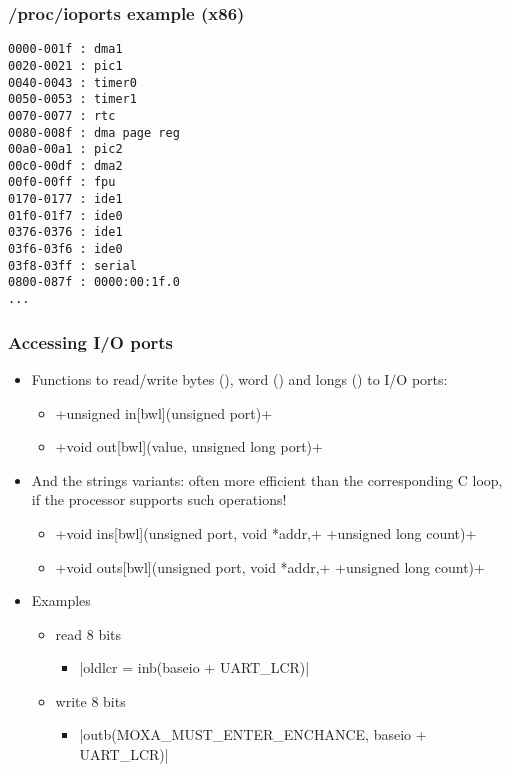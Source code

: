 \begin{frame}[fragile]
  \frametitle{/proc/ioports example (x86)}
{\small
\begin{verbatim}
0000-001f : dma1
0020-0021 : pic1
0040-0043 : timer0
0050-0053 : timer1
0070-0077 : rtc
0080-008f : dma page reg
00a0-00a1 : pic2
00c0-00df : dma2
00f0-00ff : fpu
0170-0177 : ide1
01f0-01f7 : ide0
0376-0376 : ide1
03f6-03f6 : ide0
03f8-03ff : serial
0800-087f : 0000:00:1f.0
...
\end{verbatim}
}
\end{frame}

\begin{frame}[fragile]
  \frametitle{Accessing I/O ports}
  \begin{itemize}
  \item Functions to read/write bytes (), word () and longs () to I/O ports:
    \begin{itemize}
    \item {}+unsigned in[bwl](unsigned port)+
    \item {}+void out[bwl](value, unsigned long port)+
    \end{itemize}
  \item And the strings variants: often more efficient than the
    corresponding C loop, if the processor supports such operations!
    \begin{itemize}
    \item {}+void ins[bwl](unsigned port, void *addr,+
      +unsigned long count)+
    \item {}+void outs[bwl](unsigned port, void *addr,+
      +unsigned long count)+
    \end{itemize}
  \item Examples
    \begin{itemize}
    \item read 8 bits
      \begin{itemize}
      \item {}|oldlcr = inb(baseio + UART_LCR)|
      \end{itemize}
    \item write 8 bits
      \begin{itemize}
      \item {}|outb(MOXA_MUST_ENTER_ENCHANCE, baseio + UART_LCR)|
      \end{itemize}
    \end{itemize}
  \end{itemize}
\end{frame}

